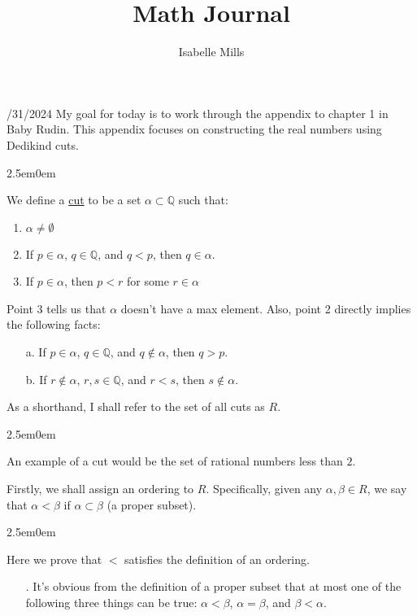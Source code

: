 \documentclass{book}
\title{Math Journal}
\author{Isabelle Mills}
\newcommand{\mRoman}[1]{%
   \textrm{\MakeUppercase{\romannumeral #1}}%
}
\newcommand{\hOne}{%
   \color{Black}%
   \fontsize{14}{16}\selectfont%
}
\newcommand{\hTwo}{%
\color{Black}%
   \fontsize{13}{15}\selectfont%
}
\newcommand{\myComment}{%
   \color{RawerSienna}%
   \fontsize{12}{14}\selectfont%
}
\newcommand{\exTwo}{%
\color{Purple}%
   \fontsize{13}{15}\selectfont%
}
\newenvironment{myIndent}{%
   \begin{adjustwidth}{2.5em}{0em}%
}{%
   \end{adjustwidth}%
}
\newcommand{\udefine}[1]{{%
   \setulcolor{Red}%
   \setul{0.14em}{0.07em}%
   \ul{#1}%
}}
\newcommand{\myHS}{ \hspace{0.5em}}
\newcommand{\retTwo}{\hfill\bigbreak}
\newcommand{\dispDate}[1]{{
   \color{Black}%
   \fontsize{20}{18}\selectfont%
   #1\retTwo
}}
\begin{document}
   \maketitle{}
   \setul{0.14em}{0.07em}
   \calibri\hOne
   
   \dispDate{8/31/2024}
   My goal for today is to work through the appendix to chapter 1 in Baby Rudin. This appendix focuses on constructing the real numbers using Dedikind cuts.\retTwo
   
   \hTwo
   \begin{myIndent}
      We define a \udefine{cut} to be a set $\alpha \subset \mathbb{Q}$ such that:
      \begin{enumerate}
         \item $\alpha \neq \emptyset$
         \item If $p \in \alpha$,\myHS $q \in \mathbb{Q}$, and $q < p$, then $q \in \alpha$.
         \item If $p \in \alpha$, then $p < r$ for some $r \in \alpha$\newline
      \end{enumerate}

      Point 3 tells us that $\alpha$ doesn't have a max element. Also, point 2 directly implies the following facts:
      \begin{itemize}
         \item[a.] If $p \in \alpha$,\myHS $q \in \mathbb{Q}$, and $q \notin \alpha$, then $q > p$.
         \item[b.] If $r \notin \alpha$,\myHS $r, s \in \mathbb{Q}$, and $r < s$, then $s \notin \alpha$.\newline
      \end{itemize}

      As a shorthand, I shall refer to the set of all cuts as $R$.
      \begin{myIndent}\myComment
         An example of a cut would be the set of rational numbers less than $2$.\\
      \end{myIndent}

      Firstly, we shall assign an ordering to $R$. Specifically, given any $\alpha, \beta \in R$, we say that $\alpha < \beta$ if $\alpha \subset \beta$ (a proper subset).

      \begin{myIndent}\exTwo
         Here we prove that $<$ satisfies the definition of an ordering.
         \begin{itemize}
            \item[\mRoman{1}.] It's obvious from the definition of a proper subset that at most one of the following three things can be true: $\alpha < \beta$,\myHS $\alpha = \beta$, and $\beta < \alpha$.\retTwo
            

\end{itemize}
\end{myIndent}
\end{myIndent}
\end{document}
